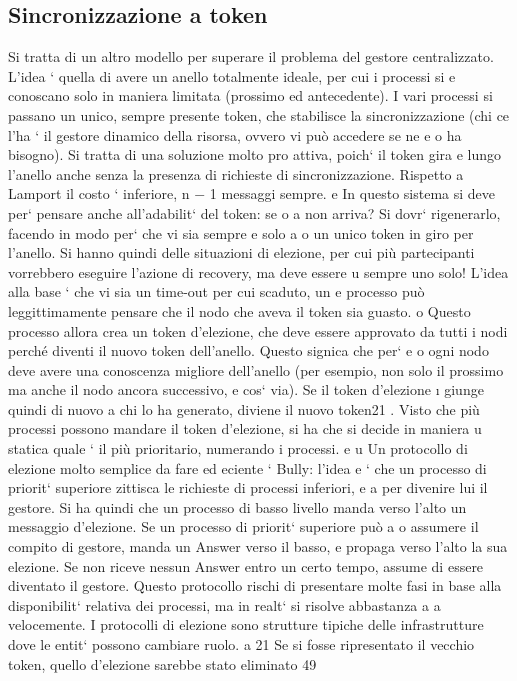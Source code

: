 \documentclass[a4paper,12pt]{article}
\begin{document}
\subsection{Sincronizzazione a token}
Si tratta di un altro modello per superare il problema del gestore centralizzato. L'idea ` quella di avere un anello
totalmente ideale, per cui i processi si
e
conoscano solo in maniera limitata (prossimo ed antecedente). I vari processi
si passano un unico, sempre presente token, che stabilisce la sincronizzazione
(chi ce l'ha ` il gestore dinamico della risorsa, ovvero vi può accedere se ne
e
o
ha bisogno). Si tratta di una soluzione molto pro attiva, poich` il token gira
e
lungo l'anello anche senza la presenza di richieste di sincronizzazione. Rispetto
a Lamport il costo ` inferiore, n $-$ 1 messaggi sempre.
e
In questo sistema si deve per` pensare anche all'adabilit` del token: se
o
a
non arriva? Si dovr` rigenerarlo, facendo in modo per` che vi sia sempre e solo
a
o
un unico token in giro per l'anello. Si hanno quindi delle situazioni di elezione,
per cui più partecipanti vorrebbero eseguire l'azione di recovery, ma deve essere
u
sempre uno solo! L'idea alla base ` che vi sia un time-out per cui scaduto, un
e
processo può leggittimamente pensare che il nodo che aveva il token sia guasto.
o
Questo processo allora crea un token d'elezione, che deve essere approvato da
tutti i nodi perché diventi il nuovo token dell'anello. Questo signica che per`
e
o
ogni nodo deve avere una conoscenza migliore dell'anello (per esempio, non solo
il prossimo ma anche il nodo ancora successivo, e cos` via). Se il token d'elezione
\i{}
giunge quindi di nuovo a chi lo ha generato, diviene il nuovo token21 . Visto che
più processi possono mandare il token d'elezione, si ha che si decide in maniera
u
statica quale ` il più prioritario, numerando i processi.
e
u
Un protocollo di elezione molto semplice da fare ed eciente ` Bully: l'idea
e
` che un processo di priorit` superiore zittisca le richieste di processi inferiori,
e
a
per divenire lui il gestore. Si ha quindi che un processo di basso livello manda
verso l'alto un messaggio d'elezione. Se un processo di priorit` superiore può
a
o
assumere il compito di gestore, manda un Answer verso il basso, e propaga verso
l'alto la sua elezione. Se non riceve nessun Answer entro un certo tempo, assume
di essere diventato il gestore. Questo protocollo rischi di presentare molte fasi
in base alla disponibilit` relativa dei processi, ma in realt` si risolve abbastanza
a
a
velocemente. I protocolli di elezione sono strutture tipiche delle infrastrutture
dove le entit` possono cambiare ruolo.
a
21 Se
si fosse ripresentato il vecchio token, quello d'elezione sarebbe stato eliminato
49
\end{document}
